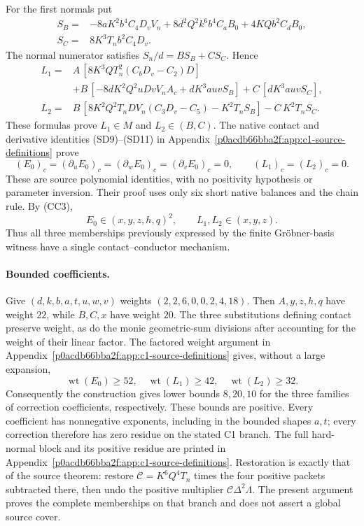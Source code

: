 For the first normals put
\begin{align*}
 S_B={}&-8aK^2b^4C_4D_vV_n
          +8d^2Q^2k^6b^4C_aB_0+4KQb^2C_dB_0,\\
 S_C={}&8K^3T_nb^2C_4D_v.
\end{align*}
The normal numerator satisfies $S_n/d=BS_B+CS_C$. Hence
\begin{align*}
 L_1={}& A\,[8K^3QT_n^2(C_bD_v-C_2)D]\\
 &+B\,[-8dK^2Q^2uDvV_nA_c+dK^3auvS_B]
       +C\,[dK^3auvS_C],\\
 L_2={}&B\,[8K^2Q^2T_nDV_n(C_3D_v-C_5)-K^2T_nS_B]
       -C\,K^2T_nS_C.
\end{align*}
These formulas prove $L_1\in M$ and $L_2\in(B,C)$.
The native contact and derivative identities (SD9)--(SD11) in
Appendix~\ref{p0acdb66bba2f:app:c1-source-definitions} prove
\[
 (E_0)_c=(\partial_uE_0)_c=(\partial_wE_0)_c
          =(\partial_vE_0)_c=0,\qquad (L_1)_c=(L_2)_c=0.      \tag{CC7}
\]
These are source polynomial identities, with no positivity hypothesis or
parameter inversion. Their proof uses only six short native balances and
the chain rule. 
By (CC3),
\[
 E_0\in(x,y,z,h,q)^2,\qquad L_1,L_2\in(x,y,z).          \tag{CC8}
\]
Thus all three memberships previously expressed by the finite
Gr\"obner-basis witness have a single contact--conductor mechanism.

\paragraph{Bounded coefficients.}
Give $(d,k,b,a,t,u,w,v)$ weights $(2,2,6,0,0,2,4,18)$.
Then $A,y,z,h,q$ have weight $22$, while $B,C,x$ have weight $20$.
The three substitutions defining contact preserve weight, as do the
monic geometric-sum divisions after accounting for the weight of their
linear factor. The factored weight argument in
Appendix~\ref{p0acdb66bba2f:app:c1-source-definitions} gives, without a large expansion,
\[
 \operatorname{wt}(E_0)\ge52,\quad
 \operatorname{wt}(L_1)\ge42,\quad
 \operatorname{wt}(L_2)\ge32.
\]
Consequently the construction gives lower bounds $8,20,10$ for the
three families of correction coefficients, respectively. These bounds are positive. Every coefficient has nonnegative
exponents, including in the bounded shapes $a,t$; every correction
therefore has zero residue on the stated C1 branch. The full hard-normal
block and its positive residue are printed in
Appendix~\ref{p0acdb66bba2f:app:c1-source-definitions}. Restoration is exactly that of the source theorem: restore
$\mathcal C=K^6Q^4T_n$ times the four positive packets subtracted there,
then undo the positive multiplier $\mathcal C\Delta^2\Lambda$. The present argument proves the complete
memberships on that branch and does not assert a global source cover.


